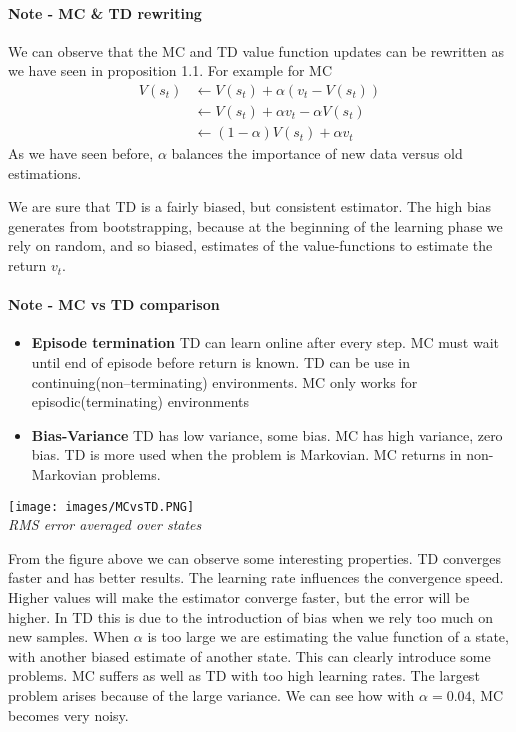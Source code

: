 \documentclass[../main.tex]{subfiles}
\begin{document}
\paragraph{Note - MC \& TD rewriting} We can observe that the MC and TD value function updates can be rewritten as we have seen in proposition 1.1.
For example for MC
\begin{align*}
    V(s_t) & \leftarrow V(s_t) + \alpha(v_t-V(s_t))        \\
           & \leftarrow V(s_t) + \alpha v_t- \alpha V(s_t) \\
           & \leftarrow (1-\alpha)V(s_t) + \alpha v_t
\end{align*}
As we have seen before, $\alpha$ balances the importance of new data versus old estimations.
\newline
\par
\noindent
We are sure that TD is a fairly biased, but consistent estimator. The high bias generates from bootstrapping, because at the beginning of the learning phase we rely on random, and so biased, estimates of the value-functions to estimate the return $v_t$.

\paragraph{Note - MC vs TD comparison}
\begin{itemize}
    \item \textbf{Episode termination} TD can learn online after every step. MC must wait until end of episode before return is known. TD can be use in continuing(non–terminating) environments. MC only works for episodic(terminating) environments
    \item \textbf{Bias-Variance} TD has low variance, some bias. MC has high variance, zero bias. TD is more used when the problem is Markovian. MC returns in non-Markovian problems.
\end{itemize}
\begin{center}
    \texttt{[image: images/MCvsTD.PNG]} \\
    \textit{RMS error averaged over states}
\end{center}
From the figure above we can observe some interesting properties. TD converges faster and has better results. The learning rate influences the convergence speed. Higher values will make the estimator converge faster, but the error will be higher. In TD this is due to the introduction of bias when we rely too much on new samples. When $\alpha$ is too large we are estimating the value function of a state, with another biased estimate of another state. This can clearly introduce some problems. MC suffers as well as TD with too high learning rates. The largest problem arises because of the large variance. We can see how with $\alpha=0.04$, MC becomes very noisy.
\end{document}
